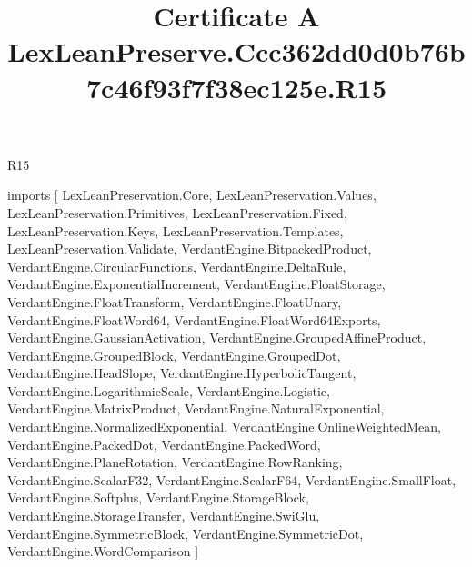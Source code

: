 \begin{lexlean}{R15}
\title{Certificate A LexLeanPreserve.Ccc362dd0d0b76b7c46f93f7f38ec125e.R15}
\begin{coremodule}
imports [
  LexLeanPreservation.Core,
  LexLeanPreservation.Values,
  LexLeanPreservation.Primitives,
  LexLeanPreservation.Fixed,
  LexLeanPreservation.Keys,
  LexLeanPreservation.Templates,
  LexLeanPreservation.Validate,
  VerdantEngine.BitpackedProduct,
  VerdantEngine.CircularFunctions,
  VerdantEngine.DeltaRule,
  VerdantEngine.ExponentialIncrement,
  VerdantEngine.FloatStorage,
  VerdantEngine.FloatTransform,
  VerdantEngine.FloatUnary,
  VerdantEngine.FloatWord64,
  VerdantEngine.FloatWord64Exports,
  VerdantEngine.GaussianActivation,
  VerdantEngine.GroupedAffineProduct,
  VerdantEngine.GroupedBlock,
  VerdantEngine.GroupedDot,
  VerdantEngine.HeadSlope,
  VerdantEngine.HyperbolicTangent,
  VerdantEngine.LogarithmicScale,
  VerdantEngine.Logistic,
  VerdantEngine.MatrixProduct,
  VerdantEngine.NaturalExponential,
  VerdantEngine.NormalizedExponential,
  VerdantEngine.OnlineWeightedMean,
  VerdantEngine.PackedDot,
  VerdantEngine.PackedWord,
  VerdantEngine.PlaneRotation,
  VerdantEngine.RowRanking,
  VerdantEngine.ScalarF32,
  VerdantEngine.ScalarF64,
  VerdantEngine.SmallFloat,
  VerdantEngine.Softplus,
  VerdantEngine.StorageBlock,
  VerdantEngine.StorageTransfer,
  VerdantEngine.SwiGlu,
  VerdantEngine.SymmetricBlock,
  VerdantEngine.SymmetricDot,
  VerdantEngine.WordComparison
]


\end{coremodule}
\end{lexlean}
